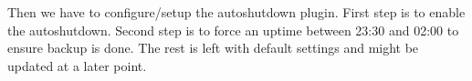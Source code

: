 
Then we have to configure/setup the autoshutdown plugin. First step is to
enable the autoshutdown. Second step is to force an uptime between 23:30 and
02:00 to ensure backup is done. The rest is left with default settings and
might be updated at a later point.



